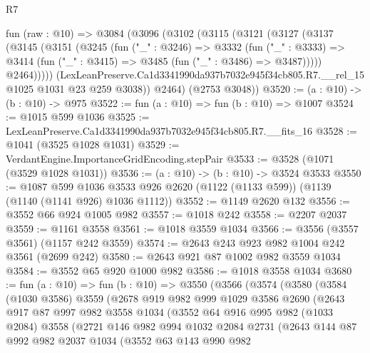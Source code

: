 \begin{lexlean}{R7}
\begin{coremodule}
  fun (raw : @10) =>
  @3084
    (@3096
      (@3102
        (@3115
          (@3121
            (@3127
              (@3137
                (@3145
                  (@3151
                    (@3245
                      (fun ("_" : @3246) =>
                      @3332
                        (fun ("_" : @3333) =>
                        @3414 (fun ("_" : @3415) => @3485 (fun ("_" : @3486) => @3487)))))
                    @2464)))))
          (LexLeanPreserve.Ca1d3341990da937b7032e945f34cb805.R7.__rel_15
            @1025
            @1031
            @23
            @259
            @3038))
        @2464)
      (@2753 @3048))
@3520 := (a : @10) -> (b : @10) -> @975
@3522 := fun (a : @10) => fun (b : @10) => @1007
@3524 := @1015 @599 @1036
@3525 := LexLeanPreserve.Ca1d3341990da937b7032e945f34cb805.R7.__fits_16
@3528 := @1041 (@3525 @1028 @1031)
@3529 := VerdantEngine.ImportanceGridEncoding.stepPair
@3533 := @3528 (@1071 (@3529 @1028 @1031))
@3536 := (a : @10) -> (b : @10) -> @3524 @3533
@3550 := @1087
    @599
    @1036
    @3533
    @926
    @2620
    (@1122 (@1133 @599))
    (@1139 (@1140 (@1141 @926) @1036 @1112))
@3552 := @1149 @2620 @132
@3556 := @3552 @66 @924 @1005 @982
@3557 := @1018 @242
@3558 := @2207 @2037
@3559 := @1161 @3558
@3561 := @1018 @3559 @1034
@3566 := @3556 (@3557 @3561) (@1157 @242 @3559)
@3574 := @2643 @243 @923 @982 @1004 @242 @3561 (@2699 @242)
@3580 := @2643 @921 @87 @1002 @982 @3559 @1034
@3584 := @3552 @65 @920 @1000 @982
@3586 := @1018 @3558 @1034
@3680 := fun (a : @10) =>
  fun (b : @10) =>
  @3550
    (@3566
      (@3574
        (@3580
          (@3584
            (@1030 @3586)
            @3559
            (@2678
              @919
              @982
              @999
              @1029
              @3586
              @2690
              (@2643
                @917
                @87
                @997
                @982
                @3558
                @1034
                (@3552
                  @64
                  @916
                  @995
                  @982
                  (@1033 @2084)
                  @3558
                  (@2721
                    @146
                    @982
                    @994
                    @1032
                    @2084
                    @2731
                    (@2643
                      @144
                      @87
                      @992
                      @982
                      @2037
                      @1034
                      (@3552
                        @63
                        @143
                        @990
                        @982

\end{coremodule}
\end{lexlean}
